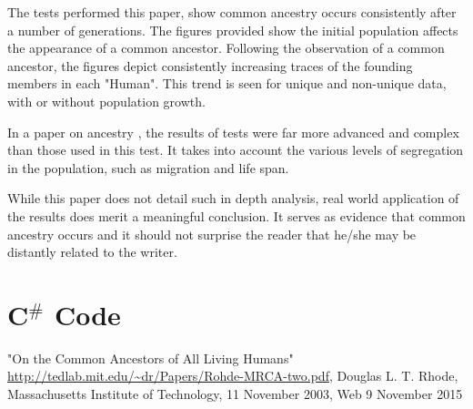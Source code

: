 \documentclass[12pt]{extarticle}
\begin{document}
The tests performed this paper, show common ancestry occurs consistently after a number of generations. The figures provided show the initial population affects the appearance of a common ancestor. Following the observation of a common ancestor, the figures depict consistently increasing traces of the founding members in each "Human". This trend is seen for unique and non-unique data, with or without population growth.

In a paper on ancestry \cite{Population}, the results of tests were far more advanced and complex than those used in this test. It takes into account the various levels of segregation in the population, such as migration and life span.

While this paper does not detail such in depth analysis, real world application of the results does merit a meaningful conclusion. It serves as evidence that common ancestry occurs and it should not surprise the reader that he/she may be distantly related to the writer.




\newpage

\lstset{basicstyle=\footnotesize,breaklines=true}
\lstset{framextopmargin=50pt,frame=bottomline}

\section{C$^{\#}$ Code}
\newpage
\begin{thebibliography}{99}
"On the Common Ancestors of All Living Humans" \url{http://tedlab.mit.edu/~dr/Papers/Rohde-MRCA-two.pdf}, Douglas L. T. Rhode, Massachusetts Institute of Technology, 11 November 2003, Web 9 November 2015

\end{thebibliography}
\end{document}
